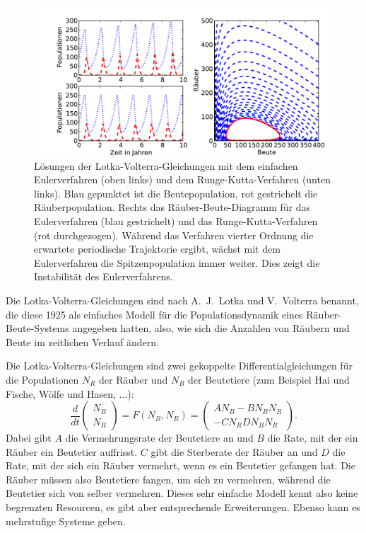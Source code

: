 \begin{figure}
  \centering
  \includegraphics[width=\textwidth]{plots/lotka-volterra}
  \caption{Lösungen der Lotka-Volterra-Gleichungen mit dem einfachen
    Eulerverfahren (oben links) und dem Runge-Kutta-Verfahren (unten
    links). Blau gepunktet ist die Beutepopulation, rot gestrichelt
    die Räuberpopulation. Rechts das Räuber-Beute-Diagramm für das
    Eulerverfahren (blau gestrichelt) und das Runge-Kutta-Verfahren
    (rot durchgezogen). Während das Verfahren vierter Ordnung die
    erwartete periodische Trajektorie ergibt, wächst mit dem
    Eulerverfahren die Spitzenpopulation immer weiter. Dies zeigt die
    Instabilität des Eulerverfahrens.}
  \label{fig:lotka}
\end{figure}

Die Lotka-Volterra-Gleichungen sind nach A.~J.~Lotka und V.~Volterra
benannt, die diese 1925 als einfaches Modell für die
Populationsdynamik eines Räuber-Beute-Systems angegeben hatten, also,
wie sich die Anzahlen von Räubern und Beute im zeitlichen Verlauf
ändern.

Die Lotka-Volterra-Gleichungen sind zwei gekoppelte
Differentialgleichungen für die Populationen $N_R$ der Räuber und
$N_B$ der Beutetiere (zum Beispiel Hai und Fische, Wölfe und Hasen,
...):
\begin{equation}
  \label{eq:lotka-volterra}
  \frac{d}{dt}
  \begin{pmatrix}
    N_B\\
    N_R
  \end{pmatrix}
  = F(N_B, N_R) = 
  \begin{pmatrix}
    A N_B  - B N_BN_R\\
    -C N_R  D N_BN_R
  \end{pmatrix}.
\end{equation}
Dabei gibt $A$ die Vermehrungsrate der Beutetiere an und $B$ die Rate,
mit der ein Räuber ein Beutetier auffrisst. $C$ gibt die Sterberate
der Räuber an und $D$ die Rate, mit der sich ein Räuber vermehrt, wenn
es ein Beutetier gefangen hat. Die Räuber müssen also Beutetiere
fangen, um sich zu vermehren, während die Beutetier sich von selber
vermehren. Dieses sehr einfache Modell kennt also keine begrenzten
Resourcen, es gibt aber entsprechende Erweiterungen. Ebenso kann es
mehrstufige Systeme geben.

